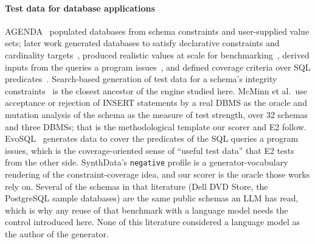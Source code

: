 \documentclass[preprint,12pt]{elsarticle}
\begin{document}
\paragraph{Test data for database applications} AGENDA~\cite{chays2004agenda} populated databases from schema constraints and user-supplied value sets; later work generated databases to satisfy declarative constraints and cardinality targets~\cite{arasu2011declarative}, produced realistic values at scale for benchmarking~\cite{bruno2005flexible,houkjaer2006simple}, derived inputs from the queries a program issues~\cite{emmi2007dynamic}, and defined coverage criteria over SQL predicates~\cite{tuya2010full}. Search-based generation of test data for a schema's integrity constraints~\cite{kapfhammer2013search,mcminn2015effectiveness} is the closest ancestor of the engine studied here. McMinn et al.\ use acceptance or rejection of INSERT statements by a real DBMS as the oracle and mutation analysis of the schema as the measure of test strength, over 32 schemas and three DBMSs; that is the methodological template our scorer and E2 follow. EvoSQL~\cite{castelein2018evosql} generates data to cover the predicates of the SQL queries a program issues, which is the coverage-oriented sense of ``useful test data'' that E2 tests from the other side. SynthData's \texttt{negative} profile is a generator-vocabulary rendering of the constraint-coverage idea, and our scorer is the oracle those works rely on. Several of the schemas in that literature (Dell DVD Store, the PostgreSQL sample databases) are the same public schemas an LLM has read, which is why any reuse of that benchmark with a language model needs the control introduced here. None of this literature considered a language model as the author of the generator.
\end{document}
